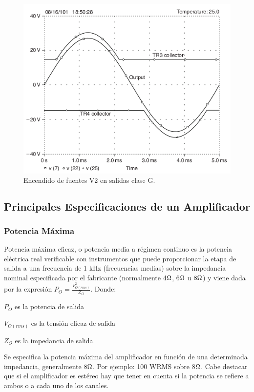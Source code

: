 \begin{figure}[H]
 \centering
 \includegraphics[scale=0.55]{img/ampliG_salida.png}
 \caption{Encendido de fuentes V2 en salidas clase G.}
 \label{ampliG_salida} 
 \end{figure}

\subsection{Principales Especificaciones de un Amplificador}
\medskip 
\subsubsection*{Potencia Máxima}

Potencia máxima eficaz, o potencia media a régimen continuo es la potencia eléctrica real verificable con instrumentos que puede proporcionar la etapa de salida  a una frecuencia de 1 kHz (frecuencias medias) sobre la impedancia nominal especificada por el fabricante (normalmente 4$\ohm$, 6$\ohm$ u $8\ohm$) y viene dada por la expresión $P_O=  \frac{V_{O(rms)}^2}{Z_O}$. Donde:
\begin{description}
\item $P_O$ es la potencia de salida
\item $V_{O(rms)}$ es la tensión eficaz de salida
\item $Z_O$ es la impedancia de salida
\end{description}

Se especifica la potencia máxima del amplificador en función de una determinada impedancia, generalmente $8\ohm$. Por ejemplo: 100 WRMS sobre 8$\ohm$.
Cabe destacar que si el amplificador es estéreo hay que tener en cuenta si la potencia se refiere a ambos o a cada uno de los canales.
\medskip 
